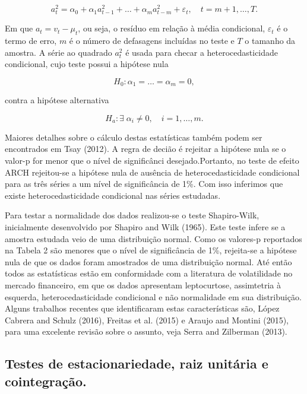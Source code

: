\documentclass[]{article}
\begin{document}
\begin{equation}
a_t^2=\alpha_0+\alpha_1a_{t-1}^2+\ldots+\alpha_ma_{t-m}^2+\varepsilon_t,\quad t=m+1,\ldots,T.
\end{equation}

Em que \(a_t=v_t-\mu_t\), ou seja, o resíduo em relação à média
condicional, \(\varepsilon_t\) é o termo de erro, \(m\) é o número de
defasagens incluídas no teste e \(T\) o tamanho da amostra. A série ao
quadrado \(a_t^2\) é usada para checar a heterocedasticidade
condicional, cujo teste possui a hipótese nula

\begin{equation}
H_0:\alpha_1=\ldots=\alpha_m=0,
\end{equation}

contra a hipótese alternativa

\begin{equation}
H_a:\exists \; \alpha_i\neq 0, \quad i=1,\ldots,m.
\end{equation}

Maiores detalhes sobre o cálculo destas estatísticas também podem ser
encontrados em Tsay (2012). A regra de decião é rejeitar a hipótese nula
se o valor-p for menor que o nível de significânci desejado.Portanto, no
teste de efeito ARCH rejeitou-se a hipótese nula de ausência de
heterocedasticidade condicional para as três séries a um nível de
significância de 1\%. Com isso inferimos que existe heterocedasticidade
condicional nas séries estudadas.

Para testar a normalidade dos dados realizou-se o teste Shapiro-Wilk,
inicialmente desenvolvido por Shapiro and Wilk (1965). Este teste infere
se a amostra estudada veio de uma distribuição normal. Como os valores-p
reportados na Tabela 2 são menores que o nível de significância de 1\%,
rejeita-se a hipótese nula de que os dados foram amostrados de uma
distribuição normal. Até então todos as estatísticas estão em
conformidade com a literatura de volatilidade no mercado financeiro, em
que os dados apresentam leptocurtose, assimtetria à esquerda,
heterocedasticidade condicional e não normalidade em sua distribuição.
Alguns trabalhos recentes que identificaram estas características são,
López Cabrera and Schulz (2016), Freitas et al. (2015) e Araujo and
Montini (2015), para uma excelente revisão sobre o assunto, veja Serra
and Zilberman (2013).

\subsection{Testes de estacionariedade, raiz unitária e
cointegração.}\label{testes-de-estacionariedade-raiz-unitaria-e-cointegracao.}
\end{document}
